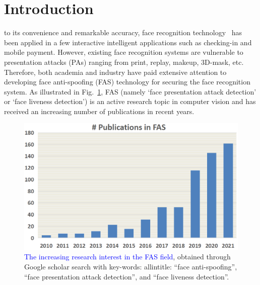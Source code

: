 \documentclass[10pt,journal,compsoc]{IEEEtran}
\begin{document}
%
\IEEEpeerreviewmaketitle


\ifCLASSOPTIONcompsoc
{}
\else
\section{Introduction}
\label{sec:introduction}
\fi




 to its convenience and remarkable accuracy, face recognition technology~\cite{guo2020learning} has been applied in a few interactive intelligent applications such as checking-in and mobile payment. However, existing face recognition systems are vulnerable to presentation attacks (PAs) ranging from print, replay, makeup, 3D-mask, etc. Therefore, both academia and industry have paid extensive attention to developing face anti-spoofing (FAS) technology for securing the face recognition system. As illustrated in Fig.~\ref{fig:Figure1}, FAS (namely `face presentation attack detection' or `face liveness detection') is an active research topic in computer vision and has received an increasing number of publications in recent years.


\begin{figure}
\centering
\includegraphics[scale=0.5]{Figures/Fig1.png}
  \caption{ 
  \textcolor{blue}{The increasing research interest in the FAS field}, obtained through Google scholar search with key-words: allintitle: “face anti-spoofing”, “face presentation attack detection”, and “face liveness detection”.
  }
\label{fig:Figure1}
\end{figure}
\end{document}
